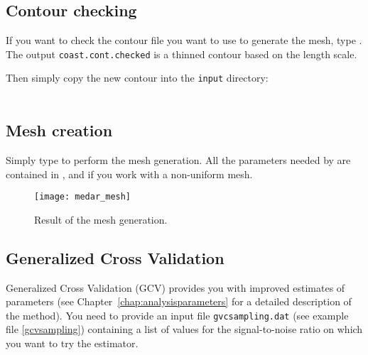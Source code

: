 \subsection{Contour checking}

If you want to check the contour file you want to use to generate the mesh, type . The output \texttt{coast.cont.checked} is a thinned contour based on the length scale.


Then simply copy the new contour into the \texttt{input} directory:\\
\\


\subsection{Mesh creation}

Simply type  to perform the mesh generation. All the parameters needed by \diva are contained in ,  and  if you work with a non-uniform mesh.
%
%


\begin{figure}[htpb]
\centering
\parbox{.65\textwidth}{
\texttt{[image: medar\_mesh]}
}\parbox{.35\textwidth}{
\caption{Result of the mesh generation.\label{divameshCL2}}
}
\end{figure}


\subsection{Generalized Cross Validation}

Generalized Cross Validation (GCV) provides you with improved estimates of parameters (see Chapter~\ref{chap:analysisparameters} for a detailed description of the method). You need to provide an input file \texttt{gvcsampling.dat} (see example file \ref{gcvsampling}) containing a list of values for the signal-to-noise ratio on which you want to try the estimator.

